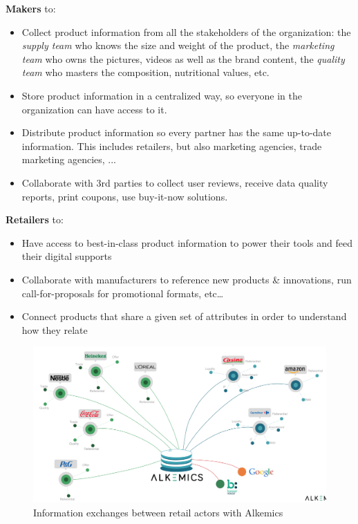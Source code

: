 \textbf{Makers} to:
    \begin{itemize}
    \item Collect product information from all the stakeholders of the organization: the \textit{supply team} who knows the size and weight of the product, the \textit{marketing team} who owns the pictures, videos as well as the brand content, the \textit{quality team} who masters the composition, nutritional values, etc.
    \item Store product information in a centralized way, so everyone in the organization can have access to it.
    \item Distribute product information so every partner has the same up-to-date information. This includes retailers, but also marketing agencies, trade marketing agencies, ...
    \item Collaborate with 3rd parties to collect user reviews,  receive data quality reports,  print coupons, use buy-it-now solutions.
    \end{itemize}

\textbf{Retailers} to:
    \begin{itemize}
    \item Have access to best-in-class product information to power their tools and feed their digital supports 
    \item Collaborate with manufacturers to reference new products \& innovations, run call-for-proposals for promotional formats, etc…
    \item Connect products that share a given set of attributes in order to understand how they relate
    \end{itemize}

\begin{figure}[H]
\centering
\includegraphics[scale=0.35]{./images/introduction/with_alk.png}
\caption{Information exchanges between retail actors with Alkemics}
\end{figure}


